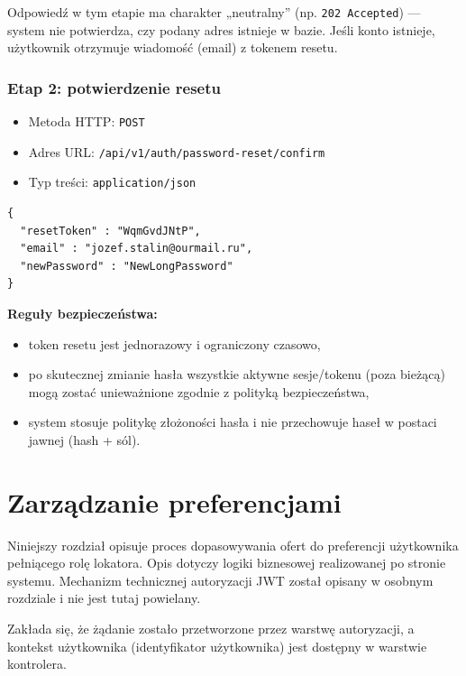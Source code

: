 \documentclass[11pt, a4paper]{article}
\begin{document}
Odpowiedź w tym etapie ma charakter „neutralny” (np. \texttt{202 Accepted}) --- system nie potwierdza, czy podany adres istnieje w bazie. Jeśli konto istnieje, użytkownik otrzymuje wiadomość (email) z tokenem resetu.

\subsubsection{Etap 2: potwierdzenie resetu}
\begin{itemize}
    \item Metoda HTTP: \texttt{POST}
    \item Adres URL: \texttt{/api/v1/auth/password-reset/confirm}
    \item Typ treści: \texttt{application/json}
\end{itemize}

\begin{lstlisting}[style=json,caption={Ciało żądania — potwierdzenie resetu hasła}]
{
  "resetToken" : "WqmGvdJNtP", 
  "email" : "jozef.stalin@ourmail.ru", 
  "newPassword" : "NewLongPassword"
}
\end{lstlisting}

\noindent\textbf{Reguły bezpieczeństwa:}
\begin{itemize}
    \item token resetu jest jednorazowy i ograniczony czasowo,
    \item po skutecznej zmianie hasła wszystkie aktywne sesje/tokenu (poza bieżącą) mogą zostać unieważnione zgodnie z polityką bezpieczeństwa,
    \item system stosuje politykę złożoności hasła i nie przechowuje haseł w postaci jawnej (hash + sól).
\end{itemize}

\section{Zarządzanie preferencjami}

Niniejszy rozdział opisuje proces dopasowywania ofert do preferencji użytkownika
pełniącego rolę lokatora. Opis dotyczy logiki biznesowej realizowanej po stronie
systemu. Mechanizm technicznej autoryzacji JWT został opisany w osobnym rozdziale
i nie jest tutaj powielany.

Zakłada się, że żądanie zostało przetworzone przez warstwę autoryzacji, a
kontekst użytkownika (identyfikator użytkownika) jest dostępny w warstwie
kontrolera.
\end{document}
